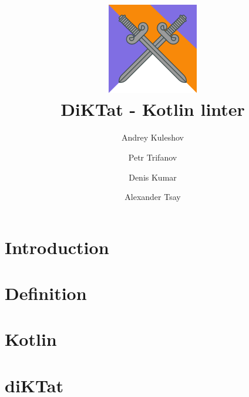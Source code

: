 \documentclass[acmlarge, screen, nonacm]{acmart}
\begin{document}
\begin{CJK*}{UTF8}{gbsn}

\title[]{
  \includegraphics[width = 150pt, height = 150]{pictures/logo.png}\\
  DiKTat - Kotlin linter
}

\author{Andrey Kuleshov}
\author{Petr Trifanov}
\author{Denis Kumar}
\author{Alexander Tsay}

\renewcommand{\shortauthors}{}

\maketitle

\section{Introduction}
\label{sec:intro}


\section{Definition}
\label{sec:definition}


\section{Kotlin}
\label{sec:kotlin}


\section{diKTat}
\label{sec:diKTat}



\end{CJK*}
\end{document}
